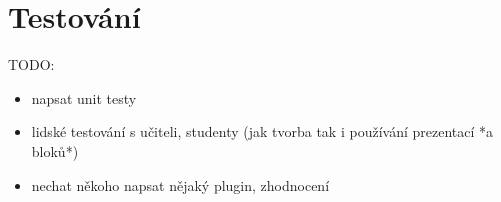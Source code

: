 \chapter{Testování}

TODO:

\begin{itemize}
    \item napsat unit testy
    \item lidské testování s učiteli, studenty (jak tvorba tak i používání prezentací *a bloků*)
    \item nechat někoho napsat nějaký plugin, zhodnocení
\end{itemize}